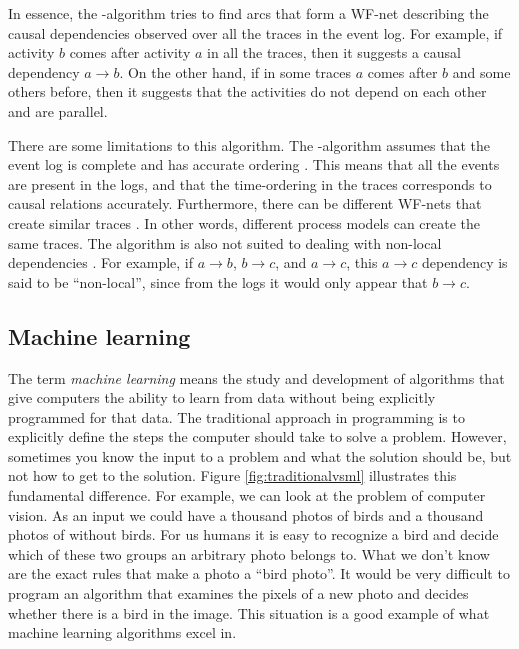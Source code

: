In essence, the \textalpha-algorithm tries to find arcs that form a WF-net describing the causal dependencies observed over all the traces in the event log. 
For example, if activity $b$ comes after activity $a$ in all the traces, then it suggests a causal dependency $a \rightarrow b$.
On the other hand, if in some traces $a$ comes after $b$ and some others before, then it suggests that the activities do not depend on each other and are parallel.

There are some limitations to this algorithm.
The \textalpha-algorithm assumes that the event log is complete and has accurate ordering \cite{van2013discovering}. This means that all the events are present in the logs, and that the time-ordering in the traces corresponds to causal relations accurately. Furthermore, there can be different WF-nets that create similar traces \cite{van2013discovering}. In other words, different process models can create the same traces.
The algorithm is also not suited to dealing with non-local dependencies \cite{van2013discovering}.
For example, if $a \rightarrow b$, $b \rightarrow c$, and $a \rightarrow c$, this $a \rightarrow c$ dependency is said to be ``non-local'', since from the logs it would only appear that $b \rightarrow c$. 


\subsection{Machine learning}

The term \textit{machine learning} means the study and development of algorithms that give computers the ability to learn from data without being explicitly programmed for that data. 
The traditional approach in programming is to explicitly define the steps the computer should take to solve a problem.
However, sometimes you know the input to a problem and what the solution should be, but not how to get to the solution.
Figure \ref{fig:traditionalvsml} illustrates this fundamental difference.
For example, we can look at the problem of computer vision.
As an input we could have a thousand photos of birds and a thousand photos of without birds.
For us humans it is easy to recognize a bird and decide which of these two groups an arbitrary photo belongs to.
What we don't know are the exact rules that make a photo a ``bird photo''.
It would be very difficult to program an algorithm that examines the pixels of a new photo and decides whether there is a bird in the image.
This situation is a good example of what machine learning algorithms excel in.

